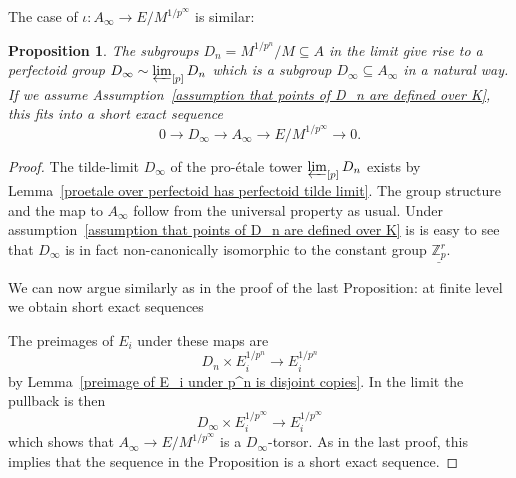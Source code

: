 \documentclass[11pt,oneside]{amsart}
\newtheorem{proposition}[theorem]{Proposition}
\theoremstyle{definition}
\theoremstyle{remark}
\begin{document}
	
	The case of $\iota:A_\infty \rightarrow E/M^{1/p^\infty}$ is similar:
	\begin{proposition}\label{the morphism A->E/M^{1/p^n} in the limit}
		The subgroups $D_n= M^{1/p^n}/M\subseteq A$ in the limit give rise to a perfectoid group $D_\infty\sim \varprojlim_{[p]}D_n$ which is a subgroup $D_\infty \subseteq A_\infty$ in a natural way.
		If we assume Assumption~\ref{assumption that points of D_n are defined over K}, this fits into a short exact sequence
		\[0\rightarrow D_\infty \rightarrow A_\infty\rightarrow E/M^{1/p^\infty}\rightarrow 0.\]
	
	\end{proposition}
	\begin{proof}
		The tilde-limit $D_\infty$ of the pro-\'etale tower $\varprojlim_{[p]}D_n$ exists by Lemma~\ref{proetale over perfectoid has perfectoid tilde limit}. The group structure and the map to $A_\infty$ follow from the universal property as usual. Under assumption~\ref{assumption that points of D_n are defined over K} is is easy to see that $D_\infty$ is in fact non-canonically isomorphic to the constant group $\underline{\mathbb Z_p^r}$.
		
		We can now argue similarly as in the proof of the last Proposition: at finite level we obtain short exact sequences 
		\begin{center}
		\end{center}
		The preimages of $E_i$ under these maps are
		\[D_n\times E_i^{1/p^n}\rightarrow E_i^{1/p^n} \]
		by Lemma~\ref{preimage of E_i under p^n is disjoint copies}. In the limit the pullback is then
		\[D_\infty \times E_i^{1/p^\infty}\rightarrow E_i^{1/p^\infty} \]
		which shows that $A_\infty \rightarrow E/M^{1/p^\infty}$ is a $D_\infty$-torsor. As in the last proof, this implies that the sequence in the Proposition is a short exact sequence.
	\end{proof}
	
\end{document}
